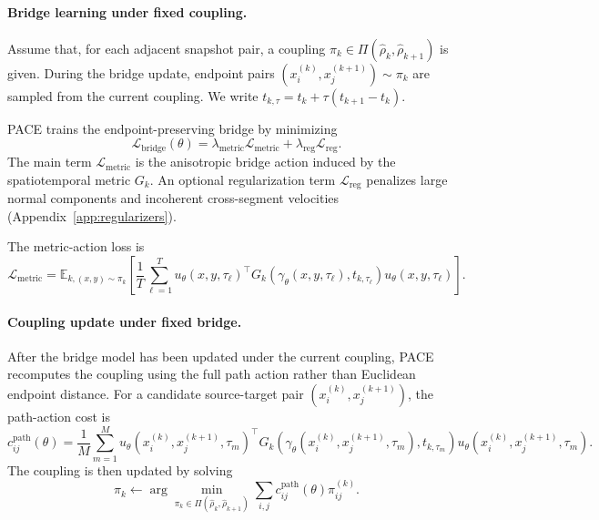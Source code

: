     
\paragraph{Bridge learning under fixed coupling.}
Assume that, for each adjacent snapshot pair, a coupling \(\pi_k\in\Pi(\hat\rho_k,\hat\rho_{k+1})\) is given. During the bridge update, endpoint pairs \((x_i^{(k)},x_j^{(k+1)})\sim\pi_k\) are sampled from the current coupling. We write \(t_{k,\tau}=t_k+\tau(t_{k+1}-t_k)\).

PACE trains the endpoint-preserving bridge by minimizing
\begin{equation}
\label{eq:total-loss}
\mathcal{L}_{\mathrm{bridge}}(\theta)
=
\lambda_{\mathrm{metric}}\mathcal{L}_{\mathrm{metric}}
+
\lambda_{\mathrm{reg}}\mathcal{L}_{\mathrm{reg}}.
\end{equation}
The main term $\mathcal{L}_{\mathrm{metric}}$ is the anisotropic bridge action induced by the spatiotemporal metric $G_k$.
An optional regularization term $\mathcal{L}_{\mathrm{reg}}$ penalizes large normal components and incoherent cross-segment velocities (Appendix~\ref{app:regularizers}).

The metric-action loss is
\begin{equation}
\label{eq:metric-loss}
\mathcal{L}_{\mathrm{metric}}
=
\mathbb{E}_{k,(x,y)\sim\pi_k}
\left[
\frac{1}{T}
\sum_{\ell=1}^{T}
u_\theta(x,y,\tau_\ell)^\top
G_k\!\left(
\gamma_\theta(x,y,\tau_\ell),
t_{k,\tau_\ell}
\right)
u_\theta(x,y,\tau_\ell)
\right].
\end{equation}
    
\paragraph{Coupling update under fixed bridge.}
After the bridge model has been updated under the current coupling, PACE recomputes the coupling using the full path action rather than Euclidean endpoint distance. For a candidate source-target pair \((x_i^{(k)},x_j^{(k+1)})\), the path-action cost is
\begin{equation}
\label{eq:path-cost}
c_{ij}^{\mathrm{path}}(\theta)
=
\frac{1}{M}
\sum_{m=1}^{M}
u_\theta(x_i^{(k)},x_j^{(k+1)},\tau_m)^\top
G_k\!\left(
\gamma_\theta(x_i^{(k)},x_j^{(k+1)},\tau_m),
t_{k,\tau_m}
\right)
u_\theta(x_i^{(k)},x_j^{(k+1)},\tau_m).
\end{equation}
The coupling is then updated by solving
\begin{equation}
\label{eq:ot-refined}
\pi_k
\leftarrow
\arg\min_{\pi_k\in\Pi(\hat\rho_k,\hat\rho_{k+1})}
\sum_{i,j}
c_{ij}^{\mathrm{path}}(\theta)\pi_{ij}^{(k)}.
\end{equation}
